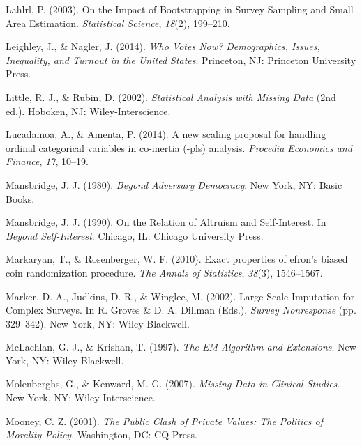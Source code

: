 \documentclass[12pt,econ]{sources/authesis}
\begin{document}
\leavevmode\hypertarget{ref-lahlrl_2003_impact}{}%
Lahlrl, P. (2003). On the Impact of Bootstrapping in Survey Sampling and Small Area Estimation. \emph{Statistical Science}, \emph{18}(2), 199--210.

\leavevmode\hypertarget{ref-leighley_who_2014}{}%
Leighley, J., \& Nagler, J. (2014). \emph{Who Votes Now? Demographics, Issues, Inequality, and Turnout in the United States}. Princeton, NJ: Princeton University Press.

\leavevmode\hypertarget{ref-little_2002_statistical}{}%
Little, R. J., \& Rubin, D. (2002). \emph{Statistical Analysis with Missing Data} (2nd ed.). Hoboken, NJ: Wiley-Interscience.

\leavevmode\hypertarget{ref-lucadamoa_2014_scaling}{}%
Lucadamoa, A., \& Amenta, P. (2014). A new scaling proposal for handling ordinal categorical variables in co-inertia (-pls) analysis. \emph{Procedia Economics and Finance}, \emph{17}, 10--19.

\leavevmode\hypertarget{ref-mansbridge_1980_beyond}{}%
Mansbridge, J. J. (1980). \emph{Beyond Adversary Democracy}. New York, NY: Basic Books.

\leavevmode\hypertarget{ref-mansbridge_1990_relation}{}%
Mansbridge, J. J. (1990). On the Relation of Altruism and Self-Interest. In \emph{Beyond Self-Interest}. Chicago, IL: Chicago University Press.

\leavevmode\hypertarget{ref-markaryan_2010_exact}{}%
Markaryan, T., \& Rosenberger, W. F. (2010). Exact properties of efron's biased coin randomization procedure. \emph{The Annals of Statistics}, \emph{38}(3), 1546--1567.

\leavevmode\hypertarget{ref-marker_2002_large-scale}{}%
Marker, D. A., Judkins, D. R., \& Winglee, M. (2002). Large-Scale Imputation for Complex Surveys. In R. Groves \& D. A. Dillman (Eds.), \emph{Survey Nonresponse} (pp. 329--342). New York, NY: Wiley-Blackwell.

\leavevmode\hypertarget{ref-mclachlan_1997_algorithm}{}%
McLachlan, G. J., \& Krishan, T. (1997). \emph{The EM Algorithm and Extensions}. New York, NY: Wiley-Blackwell.

\leavevmode\hypertarget{ref-molenberghs_2007_missing}{}%
Molenberghs, G., \& Kenward, M. G. (2007). \emph{Missing Data in Clinical Studies}. New York, NY: Wiley-Interscience.

\leavevmode\hypertarget{ref-mooney_public_2001}{}%
Mooney, C. Z. (2001). \emph{The Public Clash of Private Values: The Politics of Morality Policy}. Washington, DC: CQ Press.
\end{document}
